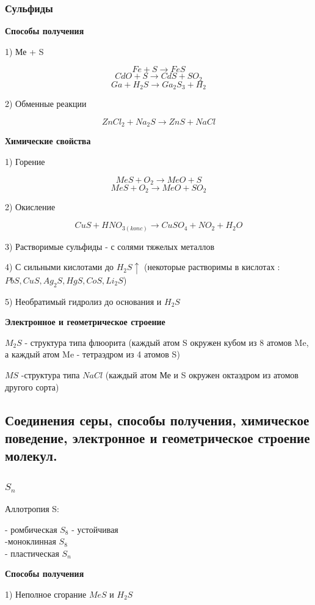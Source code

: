 \documentclass[14pt,a4paper]{scrartcl}
\begin{document}
\subsubsection{Сульфиды}

\textbf{Способы получения}

1) Ме + S

$$Fe + S \rightarrow FeS$$
$$CdO + S \rightarrow CdS + SO_2$$
$$Ga + H_2S \rightarrow Ga_2S_3 + H_2$$

2) Обменные реакции

$$ZnCl_2 + Na_2S \rightarrow ZnS + NaCl$$

\textbf{Химические свойства}

1) Горение

$$MeS + O_2 \rightarrow MeO + S$$
$$MeS + O_2 \rightarrow MeO + SO_2$$

2) Окисление

$$CuS + HNO_{3(konc)} \rightarrow CuSO_4 + NO_2 + H_2O$$

3) Растворимые сульфиды - с солями тяжелых металлов

4) С сильными кислотами до $H_2S\uparrow$ (некоторые растворимы в кислотах : $PbS, CuS, Ag_2S, HgS, CoS, Li_2S$)

5) Необратимый гидролиз до основания и $H_2S$

\textbf{Электронное и геометрическое строение}

$M_2S$ - структура типа флюорита (каждый атом S окружен кубом из 8 атомов Me, а каждый атом Me - тетраэдром из 4 атомов S)

$MS$ -структура типа $NaCl$ (каждый атом Ме и S окружен октаэдром из атомов другого сорта)

\subsection{Соединения серы, способы получения, химическое поведение, электронное и геометрическое строение молекул.}

\subsubsection{$S_n$}

Аллотропия S:

- ромбическая $S_8$ - устойчивая\\
-моноклинная $S_8$\\
- пластическая $S_n$

\textbf{Способы получения}

1) Неполное сгорание $MeS$ и $H_2S$
\end{document}
